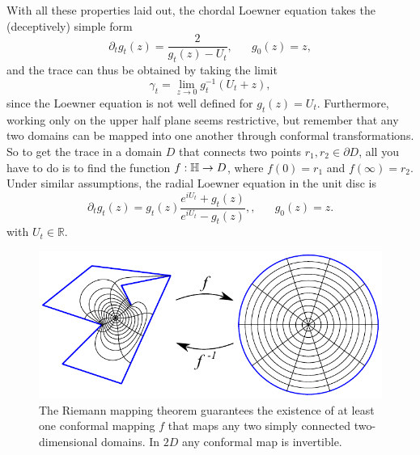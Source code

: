 With all these properties laid out, the chordal Loewner equation takes the
(deceptively) simple form
\begin{equation}
    \label{eq:loew}
    \partial_t g_t(z) = \frac{2}{g_t(z) - U_t}
    ,\,\,\,\,\,\,\,\,\,\,
    g_0(z)=z,
\end{equation}
and the trace can thus be obtained by taking the limit
\begin{equation}
    \gamma_t = \lim_{z\rightarrow 0}g_t^{-1}\left(U_t + z\right),
\end{equation}
since the Loewner equation is not well defined for $g_t(z)=U_t$.
Furthermore, working only on the upper half plane seems restrictive, but
remember that any two domains can be mapped into one another through conformal
transformations. So to get the trace in a domain $D$ that connects two points
$r_1, r_2 \in \partial D$, all you have to do is to find the function
$f:\mathbb{H}\rightarrow D$, where $f(0)=r_1$ and $f(\infty)=r_2$. Under similar
assumptions, the radial Loewner equation in the unit disc is
\begin{equation}
    \partial_{t}g_{t}\left(z\right)=
    g_{t}\left(z\right)
    \frac{e^{iU_{t}}+g_{t}\left(z\right)}
         {e^{iU_{t}}-g_{t}\left(z\right)},
    ,\,\,\,\,\,\,\,\,\,\,
    g_0(z)=z.
\end{equation}
with $U_t\in\mathbb{R}$.

\begin{figure}
\begin{center}
    \includegraphics[scale=1.0]{chapters/ch4-sle/figs/scmap}
\end{center}
\caption{The Riemann mapping theorem guarantees the existence of at least one
    conformal mapping $f$ that maps any two simply connected two-dimensional
    domains. In $2D$ any conformal map is invertible.}
\label{fig:scmap}
\end{figure}

